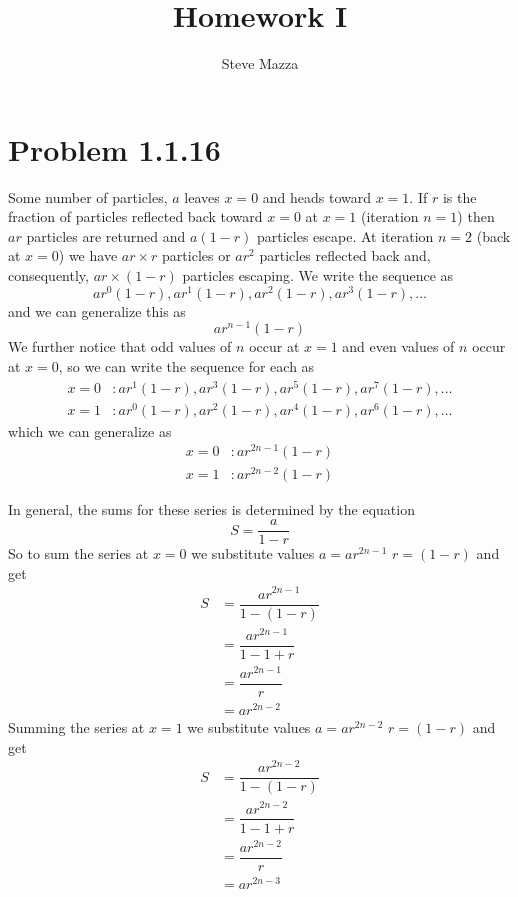 \documentclass[letterpaper,10pt]{article}
\title{Homework I}
\author{Steve Mazza}
\begin{document}
\maketitle

\section*{Problem 1.1.16}
Some number of particles, $a$ leaves $x=0$ and heads toward $x=1$.  If $r$ is the fraction of particles reflected back toward $x=0$ at $x=1$ (iteration $n=1$) then $ar$ particles are returned and $a(1-r)$ particles escape.  At iteration $n=2$ (back at $x=0$) we have $ar\times r$ particles or $ar^2$ particles reflected back and, consequently, $ar \times (1-r)$ particles escaping.  We write the sequence as
\[
	ar^0(1-r), ar^1(1-r), ar^2(1-r), ar^3(1-r),\dots
\]
and we can generalize this as 
\begin{equation}
	ar^{n-1}(1-r)
\end{equation}
We further notice that odd values of $n$ occur at $x=1$ and even values of $n$ occur at $x=0$, so we can write the sequence for each as
\begin{align*}
	x=0&: ar^{1}(1-r), ar^{3}(1-r), ar^{5}(1-r), ar^{7}(1-r),\dots \\
	x=1&: ar^{0}(1-r), ar^{2}(1-r), ar^{4}(1-r), ar^{6}(1-r),\dots
\end{align*}
which we can generalize as
\begin{align}
	x=0&: ar^{2n-1}(1-r) \\
	x=1&: ar^{2n-2}(1-r)
\end{align}

In general, the sums for these series is determined by the equation
\begin{equation*}
	S=\dfrac{a}{1-r}
\end{equation*}
So to sum the series at $x=0$ we substitute values $a=ar^{2n-1}$ $r=(1-r)$ and get
\begin{align*}
	S&= \dfrac{ar^{2n-1}}{1-(1-r)} \\
	&= \dfrac{ar^{2n-1}}{1-1+r} \\
	&= \dfrac{ar^{2n-1}}{r} \\
	&= ar^{2n-2}
\end{align*}
Summing the series at $x=1$ we substitute values $a=ar^{2n-2}$ $r=(1-r)$ and get
\begin{align*}
	S&= \dfrac{ar^{2n-2}}{1-(1-r)} \\
	&= \dfrac{ar^{2n-2}}{1-1+r} \\
	&= \dfrac{ar^{2n-2}}{r} \\
	&= ar^{2n-3}
\end{align*}
\end{document}
